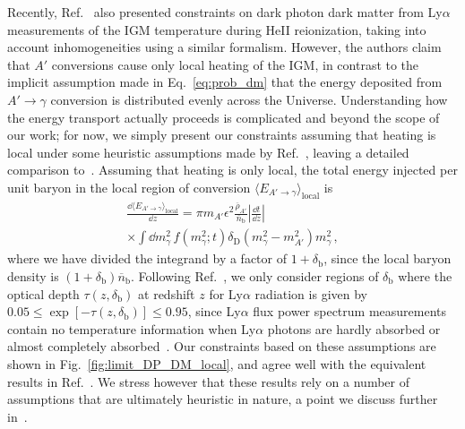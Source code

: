 \documentclass[prd,aps,10pt,nofootinbib,twocolumn,superscriptaddress,preprintnumbers,balancelastpage,longbibliography]{revtex4-1}
\begin{document}
Recently, Ref.~\cite{Witte:2020rvb} also presented constraints on dark photon dark matter from Ly$\alpha$ measurements of the IGM temperature during HeII reionization, taking into account inhomogeneities using a similar formalism. 
However, the authors claim that $A'$ conversions cause only local heating of the IGM, in contrast to the implicit assumption made in Eq.~\eqref{eq:prob_dm} that the energy deposited from $A' \to \gamma$ conversion is distributed evenly across the Universe. 
Understanding how the energy transport actually proceeds is complicated and beyond the scope of our work; for now, we simply present our constraints assuming that heating is local under some heuristic assumptions made by Ref.~\cite{Witte:2020rvb}, leaving a detailed comparison to~. 
Assuming that heating is only local, the total energy injected per unit baryon in the local region of conversion $\langle E_{A'\to \gamma} \rangle_\text{local}$ is
%
\begin{multline}
    \frac{\dd \langle E_{A' \to \gamma} \rangle_\text{local}}{\dd z} = \pi m_{A'} \epsilon^2 \frac{\overline{\rho}_{A'}}{\overline{n}_\text{b}} \left| \frac{\dd t}{\dd z} \right| \\
    \times \int \dd m_\gamma^2 \, f(m_\gamma^2;t) \delta_\text{D}(m_\gamma^2 - m_{A'}^2) m_\gamma^2 \,,
\end{multline}
%
where we have divided the integrand by a factor of $1 + \delta_\text{b}$, since the local baryon density is $(1 + \delta_\text{b}) \overline{n}_\text{b}$. 
Following Ref.~\cite{Witte:2020rvb}, we only consider regions of $\delta_\text{b}$ where the optical depth $\tau(z, \delta_\text{b})$ at redshift $z$ for Ly$\alpha$ radiation is given by $0.05 \leq \exp\left[-\tau(z, \delta_\text{b}) \right] \leq 0.95$, since Ly$\alpha$ flux power spectrum measurements contain no temperature information when Ly$\alpha$ photons are hardly absorbed or almost completely absorbed~\cite{Becker:2010cu}. 
Our constraints based on these assumptions are shown in Fig.~\ref{fig:limit_DP_DM_local}, and agree well with the equivalent results in Ref.~\cite{Witte:2020rvb}. 
We stress however that these results rely on a number of assumptions that are ultimately heuristic in nature, a point we discuss further in~.
\end{document}
